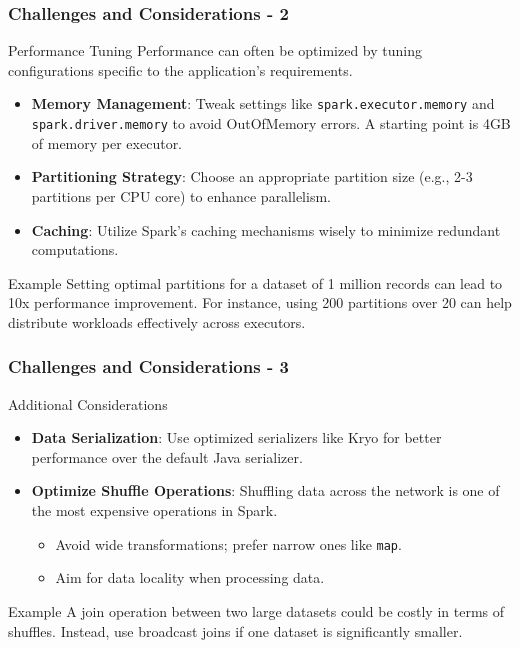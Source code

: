 \documentclass[aspectratio=169]{beamer}
\begin{document}
\begin{frame}[fragile]
    \frametitle{Challenges and Considerations - 2}
    \begin{block}{Performance Tuning}
        Performance can often be optimized by tuning configurations specific to the application’s requirements.
    \end{block}
    
    \begin{itemize}
        \item \textbf{Memory Management}: Tweak settings like \texttt{spark.executor.memory} and \texttt{spark.driver.memory} to avoid OutOfMemory errors. A starting point is 4GB of memory per executor.
        \item \textbf{Partitioning Strategy}: Choose an appropriate partition size (e.g., 2-3 partitions per CPU core) to enhance parallelism.
        \item \textbf{Caching}: Utilize Spark’s caching mechanisms wisely to minimize redundant computations.
    \end{itemize}

    \begin{exampleblock}{Example}
        Setting optimal partitions for a dataset of 1 million records can lead to 10x performance improvement. For instance, using 200 partitions over 20 can help distribute workloads effectively across executors.
    \end{exampleblock}
\end{frame}

\begin{frame}[fragile]
    \frametitle{Challenges and Considerations - 3}
    \begin{block}{Additional Considerations}
        \begin{itemize}
            \item \textbf{Data Serialization}: Use optimized serializers like Kryo for better performance over the default Java serializer.
            \item \textbf{Optimize Shuffle Operations}: Shuffling data across the network is one of the most expensive operations in Spark.
            \begin{itemize}
                \item Avoid wide transformations; prefer narrow ones like \texttt{map}.
                \item Aim for data locality when processing data.
            \end{itemize}
        \end{itemize}
    \end{block}

    \begin{exampleblock}{Example}
        A join operation between two large datasets could be costly in terms of shuffles. Instead, use broadcast joins if one dataset is significantly smaller.
    \end{exampleblock}
\end{frame}
\end{document}
